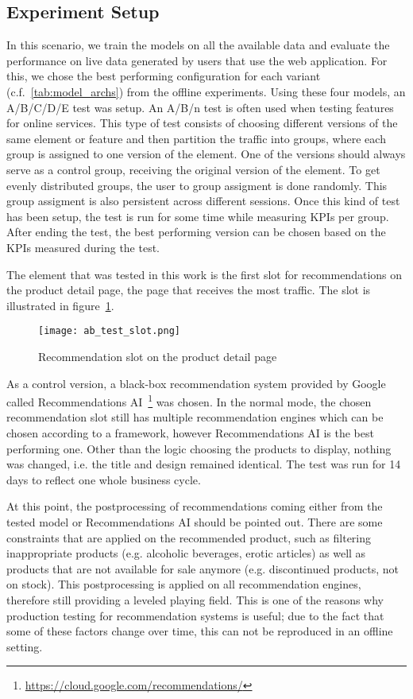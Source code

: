 \subsection{Experiment Setup}
In this scenario, we train the models on all the available data and evaluate the performance on live data generated by users that use the web application.
For this, we chose the best performing configuration for each variant (c.f.~\ref{tab:model_archs}) from the offline experiments.
Using these four models, an A/B/C/D/E test was setup.
An A/B/n test is often used when testing features for online services.
This type of test consists of choosing different versions of the same element or feature and then partition the traffic into groups, where each group is assigned to one version of the element.
One of the versions should always serve as a control group, receiving the original version of the element.
To get evenly distributed groups, the user to group assigment is done randomly.
This group assigment is also persistent across different sessions.
Once this kind of test has been setup, the test is run for some time while measuring KPIs per group.
After ending the test, the best performing version can be chosen based on the KPIs measured during the test.
\par
The element that was tested in this work is the first slot for recommendations on the product detail page, the page that receives the most traffic.
The slot is illustrated in figure~\ref{fig:ab_test_slot}.
\begin{figure}[t]
	\centering
	\captionsetup{width=0.8\textwidth}
    \texttt{[image: ab\_test\_slot.png]}
    \caption{Recommendation slot on the product detail page}
    \label{fig:ab_test_slot}
\end{figure}
As a control version, a black-box recommendation system provided by Google called Recommendations AI~\footnote{\url{https://cloud.google.com/recommendations/}} was chosen.
In the normal mode, the chosen recommendation slot still has multiple recommendation engines which can be chosen according to a framework, however Recommendations AI is the best performing one.
Other than the logic choosing the products to display, nothing was changed, i.e. the title and design remained identical.
The test was run for 14 days to reflect one whole business cycle.
\par
At this point, the postprocessing of recommendations coming either from the tested model or Recommendations AI should be pointed out.
There are some constraints that are applied on the recommended product, such as filtering inappropriate products (e.g. alcoholic beverages, erotic articles) as well as products that are not available for sale anymore (e.g. discontinued products, not on stock).
This postprocessing is applied on all recommendation engines, therefore still providing a leveled playing field.
This is one of the reasons why production testing for recommendation systems is useful; due to the fact that some of these factors change over time, this can not be reproduced in an offline setting.
